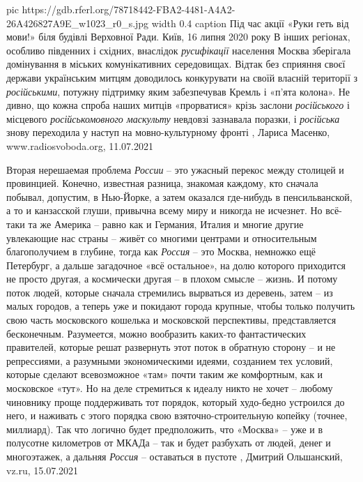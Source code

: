 \ifcmt
  pic https://gdb.rferl.org/78718442-FBA2-4481-A4A2-26A426827A9E_w1023_r0_s.jpg
  width 0.4
	caption Під час акції «Руки геть від мови!» біля будівлі Верховної Ради. Київ, 16 липня 2020 року
\fi
В інших регіонах, особливо південних і східних, внаслідок \emph{русифікації} населення
Москва зберігала домінування в міських комунікативних середовищах.
Відтак без сприяння своєї держави українським митцям доводилось конкурувати на
своїй власній території з \emph{російськими}, потужну підтримку яким забезпечував
Кремль і «п’ята колона». Не дивно, що кожна спроба наших митців «прорватися»
крізь заслони \emph{російського} і місцевого \emph{російськомовного маскульту} невдовзі
зазнавала поразки, і \emph{російська} знову переходила у наступ на мовно-культурному
фронті
, 
Лариса Масенко, www.radiosvoboda.org, 11.07.2021

Вторая нерешаемая проблема \emph{России} – это ужасный перекос между столицей и
провинцией.  Конечно, известная разница, знакомая каждому, кто сначала побывал,
допустим, в Нью-Йорке, а затем оказался где-нибудь в пенсильванской, а то и
канзасской глуши, привычна всему миру и никогда не исчезнет. Но всё-таки та же
Америка – равно как и Германия, Италия и многие другие увлекающие нас страны –
живёт со многими центрами и относительным благополучием в глубине, тогда как
\emph{Россия} – это Москва, немножко ещё Петербург, а дальше загадочное «всё
остальное», на долю которого приходится не просто другая, а космически другая –
в плохом смысле – жизнь. И потому поток людей, которые сначала стремились
вырваться из деревень, затем – из малых городов, а теперь уже и покидают города
крупные, чтобы только получить свою часть московского кошелька и московской
перспективы, представляется бесконечным. Разумеется, можно вообразить каких-то
фантастических правителей, которые решат развернуть этот поток в обратную
сторону – и не репрессиями, а разумными экономическими идеями, созданием тех
условий, которые сделают всевозможное «там» почти таким же комфортным, как и
московское «тут». Но на деле стремиться к идеалу никто не хочет – любому
чиновнику проще поддерживать тот порядок, который худо-бедно устроился до него,
и наживать с этого порядка свою взяточно-строительную копейку (точнее,
миллиард). Так что логично будет предположить, что «Москва» – уже и в полусотне
километров от МКАДа – так и будет разбухать от людей, денег и многоэтажек, а
дальняя \emph{Россия} – оставаться в пустоте
, 
Дмитрий Ольшанский, vz.ru, 15.07.2021

